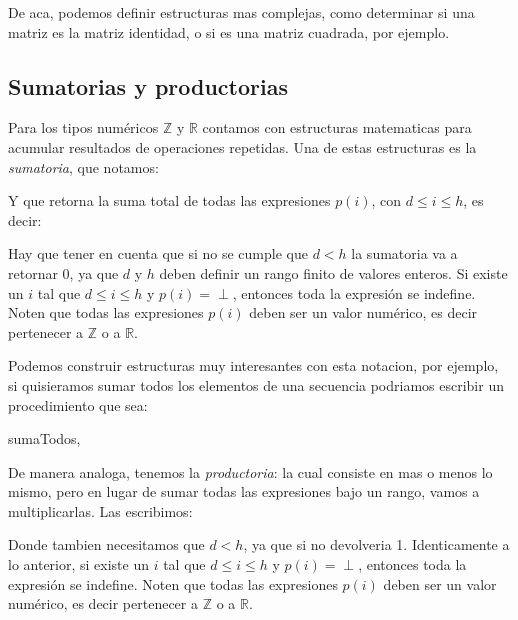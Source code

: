 \documentclass{article}
\begin{document}
De aca, podemos definir estructuras mas complejas, como determinar si una matriz es la matriz identidad, o si es una matriz cuadrada, por ejemplo.

\subsection{Sumatorias y productorias}

Para los tipos numéricos $\mathbb{Z}$ y $\mathbb{R}$ contamos con estructuras matematicas para acumular resultados de operaciones repetidas. Una de estas estructuras es la \textit{sumatoria}, que notamos:


Y que retorna la suma total de todas las expresiones $p(i)$, con $d \leq i \leq h$, es decir:


Hay que tener en cuenta que si no se cumple que $d < h$ la sumatoria va a retornar 0, ya que $d$ y $h$ deben definir un rango finito de valores enteros. Si existe un $i$ tal que $d \leq i \leq h$ y $p(i) = \perp$, entonces toda la expresión se indefine. Noten que todas las expresiones $p(i)$ deben ser un valor numérico, es decir pertenecer a $\mathbb{Z}$ o a $\mathbb{R}$.

Podemos construir estructuras muy interesantes con esta notacion, por ejemplo, si quisieramos sumar todos los elementos de una secuencia podriamos escribir un procedimiento que sea:

\begin{proc}{sumaTodos}{, }
	\requiere{\True}
	
\end{proc}

De manera analoga, tenemos la \textit{productoria}: la cual consiste en mas o menos lo mismo, pero en lugar de sumar todas las expresiones bajo un rango, vamos a multiplicarlas. Las escribimos:


Donde tambien necesitamos que $d<h$, ya que si no devolveria 1. Identicamente a lo anterior, si existe un $i$ tal que $d \leq i \leq h$ y $p(i) = \perp$, entonces toda la expresión se indefine. Noten que todas las expresiones $p(i)$ deben ser un valor numérico, es decir pertenecer a $\mathbb{Z}$ o a $\mathbb{R}$.
\end{document}
